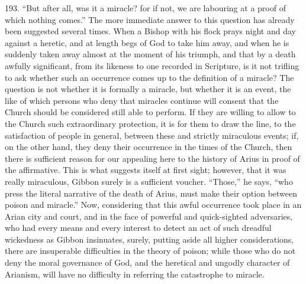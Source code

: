 193.
``But after all, was it a miracle? for if not, we are labouring at a
proof of which nothing comes.'' The more immediate answer to this
question has already been suggested several times. When a Bishop with
his flock prays night and day against a heretic, and at length begs of
God to take him away, and when he is suddenly taken away almost at the
moment of his triumph, and that by a death awfully significant, from
its likeness to one recorded in Scripture, is it not trifling to
ask whether such an occurrence comes up to the definition of a
miracle? The question is not whether it is formally a miracle, but
whether it is an event, the like of which persons who deny that
miracles continue will consent that the Church should be considered
still able to perform. If they are willing to allow to the Church such
extraordinary protection, it is for them to draw the line, to the
satisfaction of people in general, between these and strictly
miraculous events; if, on the other hand, they deny their occurrence
in the times of the Church, then there is sufficient reason for our
appealing here to the history of Arius in proof of the affirmative.
This is what suggests itself at first sight; however, that it was
really miraculous, Gibbon surely is a sufficient voucher. ``Those,'' he
says, ``who press the literal narrative of the death of Arius, must
make their option between poison and miracle.'' Now, considering that
this awful occurrence took place in an Arian city and court, and in
the face of powerful and quick-sighted adversaries, who had every
means and every interest to detect an act of such dreadful wickedness
as Gibbon insinuates, surely, putting aside all higher considerations,
there are insuperable difficulties in the theory of poison; while
those who do not deny the moral governance of God, and the heretical
and ungodly character of Arianism, will have no difficulty in
referring the catastrophe to miracle.

